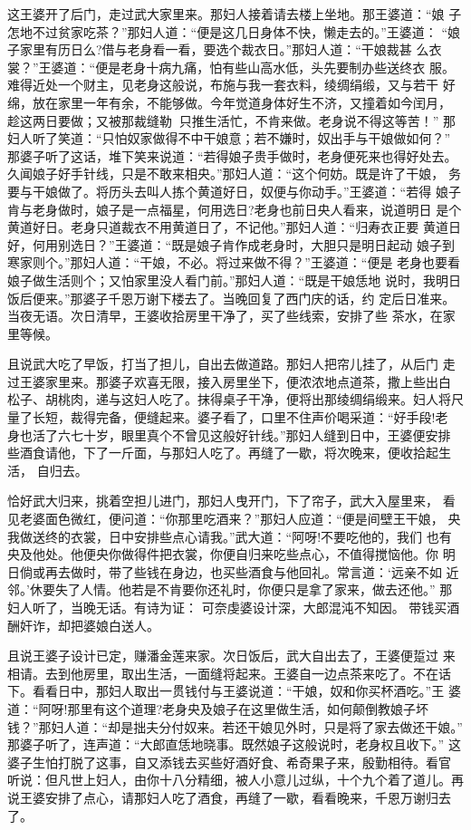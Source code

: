 这王婆开了后门，走过武大家里来。那妇人接着请去楼上坐地。那王婆道：“娘
子怎地不过贫家吃茶？”那妇人道：“便是这几日身体不快，懒走去的。”王婆道：
“娘子家里有历日么?借与老身看一看，要选个裁衣日。”那妇人道：“干娘裁甚
么衣裳？”王婆道：“便是老身十病九痛，怕有些山高水低，头先要制办些送终衣
服。难得近处一个财主，见老身这般说，布施与我一套衣料，绫绸绢缎，又与若干
好绵，放在家里一年有余，不能够做。今年觉道身体好生不济，又撞着如今闰月，
趁这两日要做；又被那裁缝勒，只推生活忙，不肯来做。老身说不得这等苦！”
那妇人听了笑道：“只怕奴家做得不中干娘意；若不嫌时，奴出手与干娘做如何？”
那婆子听了这话，堆下笑来说道：“若得娘子贵手做时，老身便死来也得好处去。
久闻娘子好手针线，只是不敢来相央。”那妇人道：“这个何妨。既是许了干娘，
务要与干娘做了。将历头去叫人拣个黄道好日，奴便与你动手。”王婆道：“若得
娘子肯与老身做时，娘子是一点福星，何用选日?老身也前日央人看来，说道明日
是个黄道好日。老身只道裁衣不用黄道日了，不记他。”那妇人道：“归寿衣正要
黄道日好，何用别选日？”王婆道：“既是娘子肯作成老身时，大胆只是明日起动
娘子到寒家则个。”那妇人道：“干娘，不必。将过来做不得？”王婆道：“便是
老身也要看娘子做生活则个；又怕家里没人看门前。”那妇人道：“既是干娘恁地
说时，我明日饭后便来。”那婆子千恩万谢下楼去了。当晚回复了西门庆的话，约
定后日准来。当夜无语。次日清早，王婆收拾房里干净了，买了些线索，安排了些
茶水，在家里等候。

且说武大吃了早饭，打当了担儿，自出去做道路。那妇人把帘儿挂了，从后门
走过王婆家里来。那婆子欢喜无限，接入房里坐下，便浓浓地点道茶，撒上些出白
松子、胡桃肉，递与这妇人吃了。抹得桌子干净，便将出那绫绸绢缎来。妇人将尺
量了长短，裁得完备，便缝起来。婆子看了，口里不住声价喝采道：“好手段!老
身也活了六七十岁，眼里真个不曾见这般好针线。”那妇人缝到日中，王婆便安排
些酒食请他，下了一斤面，与那妇人吃了。再缝了一歇，将次晚来，便收拾起生活，
自归去。

恰好武大归来，挑着空担儿进门，那妇人曳开门，下了帘子，武大入屋里来，
看见老婆面色微红，便问道：“你那里吃酒来？”那妇人应道：“便是间壁王干娘，
央我做送终的衣裳，日中安排些点心请我。”武大道：“阿呀!不要吃他的，我们
也有央及他处。他便央你做得件把衣裳，你便自归来吃些点心，不值得搅恼他。你
明日倘或再去做时，带了些钱在身边，也买些酒食与他回礼。常言道：‘远亲不如
近邻。’休要失了人情。他若是不肯要你还礼时，你便只是拿了家来，做去还他。”
那妇人听了，当晚无话。有诗为证：
可奈虔婆设计深，大郎混沌不知因。
带钱买酒酬奸诈，却把婆娘白送人。

且说王婆子设计已定，赚潘金莲来家。次日饭后，武大自出去了，王婆便踅过
来相请。去到他房里，取出生活，一面缝将起来。王婆自一边点茶来吃了。不在话
下。看看日中，那妇人取出一贯钱付与王婆说道：“干娘，奴和你买杯酒吃。”王
婆道：“阿呀!那里有这个道理?老身央及娘子在这里做生活，如何颠倒教娘子坏
钱？”那妇人道：“却是拙夫分付奴来。若还干娘见外时，只是将了家去做还干娘。”
那婆子听了，连声道：“大郎直恁地晓事。既然娘子这般说时，老身权且收下。”
这婆子生怕打脱了这事，自又添钱去买些好酒好食、希奇果子来，殷勤相待。看官
听说：但凡世上妇人，由你十八分精细，被人小意儿过纵，十个九个着了道儿。再
说王婆安排了点心，请那妇人吃了酒食，再缝了一歇，看看晚来，千恩万谢归去了。

